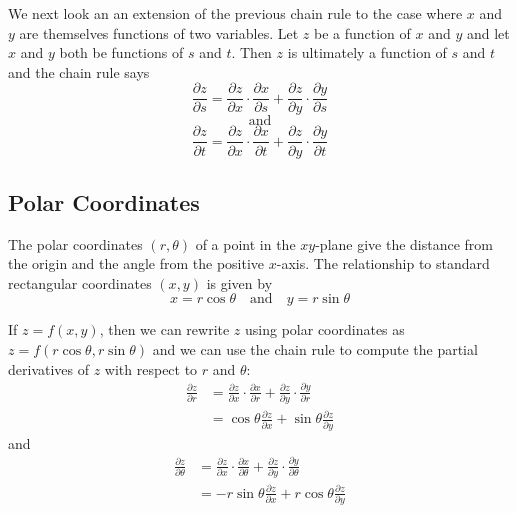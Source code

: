 \documentclass[handout]{ximera}
\begin{document}



We next look an an extension of the previous chain rule to the case  where $x$ and $y$ are themselves functions of two variables.
Let $z$ be a function of $x$ and $y$ and let $x$ and $y$ both be functions of $s$ and $t$.  Then $z$ is ultimately a function of $s$ and $t$ and the chain rule says
\[
\frac{\partial z}{\partial s} = \frac{\partial z}{\partial x} \cdot \frac{\partial x}{\partial s} + \frac{\partial z}{\partial y} \cdot \frac{\partial y}{\partial s}
\]
\[
\text{and}
\]
\[
\frac{\partial z}{\partial t} = \frac{\partial z}{\partial x} \cdot \frac{\partial x}{\partial t} + \frac{\partial z}{\partial y} \cdot \frac{\partial y}{\partial t} 
\]


\subsection{Polar Coordinates}
The polar coordinates $(r, \theta)$ of a point in the $xy$-plane give the distance from the origin and the angle from the positive $x$-axis. 
The relationship to standard rectangular coordinates $(x,y)$ is given by
\[
x = r \cos \theta \quad \text{and} \quad y = r \sin \theta
\]

If $z = f(x,y)$, then we can rewrite $z$ using polar coordinates as $z = f(r\cos \theta, r \sin \theta)$ and we can use the chain rule to 
compute the partial derivatives of $z$ with respect to $r$ and $\theta$:
\begin{align*}
\frac{\partial z}{\partial r} &= \frac{\partial z}{\partial x} \cdot \frac{\partial x}{\partial r} + \frac{\partial z}{\partial y} \cdot \frac{\partial y}{\partial r}\\
                              &= \cos \theta \frac{\partial z}{\partial x} + \sin \theta \frac{\partial z}{\partial y}
\end{align*}
and
\begin{align*}
\frac{\partial z}{\partial \theta} &= \frac{\partial z}{\partial x} \cdot \frac{\partial x}{\partial \theta} + \frac{\partial z}{\partial y} \cdot \frac{\partial y}{\partial \theta}\\
                              &= -r\sin \theta \frac{\partial z}{\partial x} + r \cos \theta \frac{\partial z}{\partial y}
\end{align*}
\end{document}
